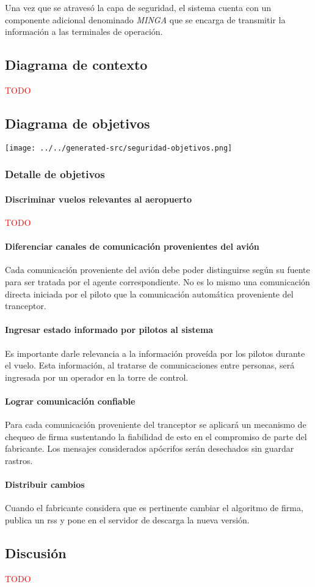 Una vez que se atravesó la capa de seguridad, el sistema cuenta con un componente adicional denominado \emph{MINGA} que se encarga de transmitir la información a las terminales de operación.

\subsection{Diagrama de contexto}
\textcolor{red}{TODO}

\subsection{Diagrama de objetivos}
\texttt{[image: ../../generated-src/seguridad-objetivos.png]}

\subsubsection{Detalle de objetivos}
\paragraph{Discriminar vuelos relevantes al aeropuerto}
\textcolor{red}{TODO}
\paragraph{Diferenciar canales de comunicación provenientes del avión}
Cada comunicación proveniente del avión debe poder distinguirse según su fuente para ser tratada por el agente correspondiente. No es lo mismo una comunicación directa iniciada por el piloto que la comunicación automática proveniente del tranceptor.
\paragraph{Ingresar estado informado por pilotos al sistema}
Es importante darle relevancia a la información proveída por los pilotos durante el vuelo. Esta información, al tratarse de comunicaciones entre personas, será ingresada por un operador en la torre de control.
\paragraph{Lograr comunicación confiable}
Para cada comunicación proveniente del tranceptor se aplicará un mecanismo de chequeo de firma sustentando la fiabilidad de esto en el compromiso de parte del fabricante. Los mensajes considerados apócrifos serán desechados sin guardar rastros.
\paragraph{Distribuir cambios}
Cuando el fabricante considera que es pertinente cambiar el algoritmo de firma, publica un rss y pone en el servidor de descarga la nueva versión.

\subsection{Discusión}
\textcolor{red}{TODO}
